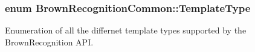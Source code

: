 \hypertarget{namespace_brown_recognition_common_a08ddb81441b8ac27fc140488e6dbb160}{
\subsubsection[{\-Template\-Type}]{\setlength{\rightskip}{0pt plus 5cm}enum {\bf \-Brown\-Recognition\-Common\-::\-Template\-Type}}}
\label{namespace_brown_recognition_common_a08ddb81441b8ac27fc140488e6dbb160}


\-Enumeration of all the differnet template types supported by the \-Brown\-Recognition \-A\-P\-I. 

